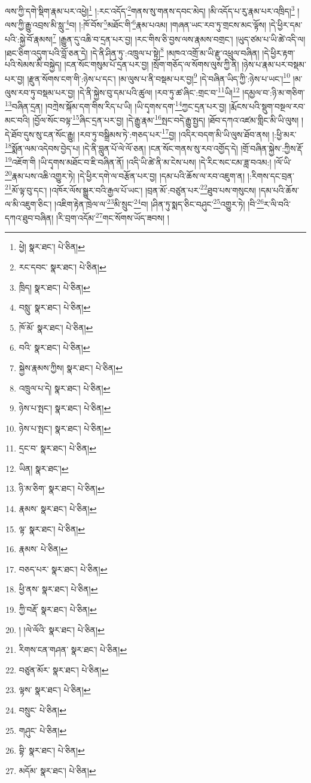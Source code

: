 ལས་ཀྱི་དགེ་སྡིག་རྣམ་པར་འཕྱེ།\footnote{ཕྱེ།  སྣར་ཐང་།  པེ་ཅིན། } །:རང་འདོད་\footnote{རང་དབང་  སྣར་ཐང་།  པེ་ཅིན། }གནས་སུ་གནས་དབང་མེད། །མི་འདོད་པ་རུ་རྣམ་པར་འཁྲིད།\footnote{ཁྲིད།  སྣར་ཐང་།  པེ་ཅིན། } །ལས་ཀྱི་རྒྱུ་འབྲས་མི་སླུ་\footnote{བསླུ་  སྣར་ཐང་།  པེ་ཅིན། }བ། །:ཁོ་བོས་\footnote{ཁོ་མོ་  སྣར་ཐང་།  པེ་ཅིན། }མཐོང་གི་\footnote{བའི་  སྣར་ཐང་།  པེ་ཅིན། }རྣམ་པའམ། །གཞན་ཡང་རབ་ཏུ་གྲངས་མང་ལྟོས། །དེ་ཕྱིར་དམ་པའི་:སྐྱེ་བོ་རྣམས།\footnote{སྐྱེས་རྣམས་ཀྱིས།  སྣར་ཐང་།  པེ་ཅིན། } །རྒྱུན་དུ་འཆི་བ་དྲན་པར་བྱ། །རང་གིས་ཅི་བྱས་ལས་རྣམས་བགྲང་། །ཡུད་ཙམ་པ་ཡི་ཚེ་འདི་ལ། །ཐང་ཅིག་འདུག་པའི་བློ་ཅན་དེ། །དེ་ནི་ཤིན་ཏུ་:འཁྲུལ་པ་སྟེ།\footnote{འཁྲུལ་པ་དེ།  སྣར་ཐང་།  པེ་ཅིན། } །མཁའ་འགྲོ་མ་ཡི་རྫུ་འཕྲུལ་བཞིན། །དེ་ཕྱིར་རྟག་པའི་སེམས་མི་བསྐྱེད། །ངན་སོང་གསུམ་པོ་དྲན་པར་བྱ། །སྲོག་གཅོད་ལ་སོགས་ལུས་ཀྱི་ནི། །ཉེས་པ་རྣམ་པར་བསྡམ་པར་བྱ། །རྫུན་སོགས་ངག་གི་:ཉེས་པ་དང་། །མ་ལུས་པ་ནི་བསྡམ་པར་བྱ།\footnote{ཉེས་པ་སྤང་།  སྣར་ཐང་།  པེ་ཅིན། } །དེ་བཞིན་ཡིད་ཀྱི་:ཉེས་པ་ཡང་།\footnote{ཉེས་པ་སྤང་།  སྣར་ཐང་།  པེ་ཅིན། } །མ་ལུས་རབ་ཏུ་བསྡམ་པར་བྱ། །དེ་ནི་སྐྱེས་བུ་དམ་པའི་ཚུལ། །རབ་ཏུ་ཚ་ཞིང་:གྲང་བ་\footnote{དྲང་བ་  སྣར་ཐང་།  པེ་ཅིན། }ཡི།\footnote{ཡིན།  སྣར་ཐང་། } །དམྱལ་བ་:ཉི་མ་གཅིག་\footnote{ཉི་མ་ཅིག་  སྣར་ཐང་།  པེ་ཅིན། }བཞིན་དྲན། །བཀྲེས་སྐོམ་དག་གིས་རིད་པ་ཡི། །ཡི་དྭགས་དག་\footnote{རྣམས་  སྣར་ཐང་།  པེ་ཅིན། }ཀྱང་དྲན་པར་བྱ། །རྨོངས་པའི་སྡུག་བསྔལ་རབ་མང་བའི། །བྱོལ་སོང་བལྟ་\footnote{ལྟ་  སྣར་ཐང་།  པེ་ཅིན། }ཞིང་དྲན་པར་བྱ། །དེ་རྒྱུ་རྣམ་\footnote{རྣམས་  པེ་ཅིན། }སྤང་བདེ་རྒྱུ་སྤྱད། །ཐོབ་དཀའ་འཛམ་གླིང་མི་ཡི་ལུས། །དེ་ཐོབ་དུས་སུ་ངན་སོང་རྒྱུ། །རབ་ཏུ་བསྒྲིམས་ཏེ་:གཅད་པར་\footnote{བཅད་པར་  སྣར་ཐང་།  པེ་ཅིན། }བྱ། །འདིར་བདག་མི་ཡི་ལུས་ཐོབ་ནས། །:ཕྱི་མར་\footnote{ཕྱི་ནས་  སྣར་ཐང་།  པེ་ཅིན། }སྨོན་ལམ་འདེབས་བྱེད་པ། །དེ་ནི་བླུན་པོ་ལེ་ལོ་ཅན། །ངན་སོང་གནས་སུ་རབ་འགྱོད་དེ། །གྲོ་བཞིན་སྐྱེས་:ཀྱིས་རྡོ་\footnote{ཀྱི་བརྡོ་  སྣར་ཐང་།  པེ་ཅིན། }འཇོག་གི །ཡི་དྭགས་མཐོང་བ་ཇི་བཞིན་ནོ། །འདི་ཡི་ཚེ་ནི་མ་ངེས་པས། །དེ་རིང་སང་ངམ་ཟླ་བའམ:། །ལོ་ཡི་\footnote{། །ལེ་ལོའི་  སྣར་ཐང་།  པེ་ཅིན། }རྣམ་པས་འཆི་འགྱུར་ཏེ། །དེ་ཕྱིར་དགེ་ལ་བརྩོན་པར་བྱ། །དམ་པའི་ཆོས་ལ་རབ་འཇུག་ན། །:རིགས་དང་བྲན་\footnote{རིགས་ངན་གཤན་  སྣར་ཐང་།  པེ་ཅིན། }མོ་ལྟ་བུ་དང་། །འཁོར་ལོས་སྒྱུར་བའི་རྒྱལ་པོ་ཡང་། །བྲན་མོ་:བཙུན་པར་\footnote{བཙུན་མོར་  སྣར་ཐང་།  པེ་ཅིན། }ཐུབ་པས་གསུངས། །དམ་པའི་ཆོས་ལ་མི་འཇུག་ཅིང་། །འཇིག་རྟེན་ཁྲེལ་ལ་\footnote{ལྟས་  སྣར་ཐང་།  པེ་ཅིན། }མི་སྲུང་\footnote{བསྲུང་  པེ་ཅིན། }བ། །ཤིན་ཏུ་སྨད་ཅིང་བཤུང་\footnote{གཤུང་  པེ་ཅིན། }འགྱུར་ཏེ། །བི་\footnote{བྷི་  སྣར་ཐང་།  པེ་ཅིན། }ར་ལི་བའི་དཀའ་ཐུབ་བཞིན། །རི་བྲག་འདོམ་\footnote{མདོམ་  སྣར་ཐང་།  པེ་ཅིན། }གང་སོགས་ཡོད་ཟབས། །
